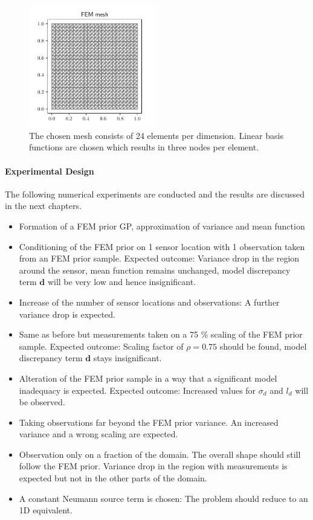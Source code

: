 \documentclass[%
  a4paper,oneside,%
  11pt,%
  smallchapters,
  style=printdev,
  extramargin,
  green,%
  rgb, <cmyk>
  ]{tubsbook}
\begin{document}
\begin{figure}[!ht]
\includegraphics[width=0.5\textwidth]{pics/mesh.pdf}
\centering
\caption[Mesh of the 2D example]{The chosen mesh consists of 24 elements per dimension. Linear basis functions are chosen which results in three nodes per element.}
\label{fig:meshFEM}
\end{figure}


\paragraph{Experimental Design}
The following numerical experiments are conducted and the results are discussed in the next chapters.

\begin{itemize}
  \item Formation of a FEM prior GP, approximation of variance and mean function
  \item Conditioning of the FEM prior on 1 sensor location with 1 observation taken from an FEM prior sample. Expected outcome: Variance drop in the region around the sensor, mean function remains unchanged, model discrepancy term $\bm{d}$ will be very low and hence insignificant.
  \item Increase of the number of sensor locations and observations: A further variance drop is expected.
  \item Same as before but measurements taken on a 75 \% scaling of the FEM prior sample. Expected outcome: Scaling factor of $\rho = 0.75$ should be found, model discrepancy term $\bm{d}$ stays insignificant.
  \item Alteration of the FEM prior sample in a way that a significant model inadequacy is expected. Expected outcome: Increased values for $\sigma_d$ and $l_d$ will be observed.
  \item Taking observations far beyond the FEM prior variance. An increased variance and a wrong scaling are expected.
  \item Observation only on a fraction of the domain. The overall shape should still follow the FEM prior. Variance drop in the region with measurements is expected but not in the other parts of the domain.
  \item A constant Neumann source term is chosen: The problem should reduce to an 1D equivalent.

\end{itemize}
\end{document}
